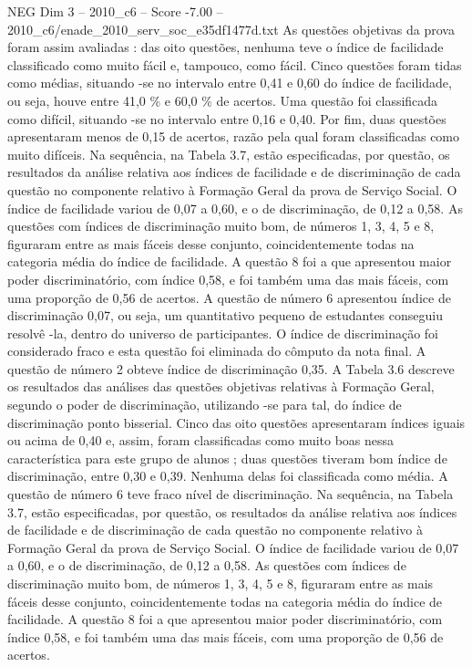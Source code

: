 \begin{textsample}{NEG Dim 3 – 2010\_c6 – Score -7.00 – 2010\_c6/enade\_2010\_serv\_soc\_e35df1477d.txt}
As questões objetivas da prova foram assim avaliadas : das oito questões, nenhuma teve o índice de facilidade classificado como muito fácil e, tampouco, como fácil.
Cinco questões foram tidas como médias, situando -se no intervalo entre 0,41 e 0,60 do índice de facilidade, ou seja, houve entre 41,0 \% e 60,0 \% de acertos.
Uma questão foi classificada como difícil, situando -se no intervalo entre 0,16 e 0,40.
Por fim, duas questões apresentaram menos de 0,15 de acertos, razão pela qual foram classificadas como muito difíceis.
Na sequência, na Tabela 3.7, estão especificadas, por questão, os resultados da análise relativa aos índices de facilidade e de discriminação de cada questão no componente relativo à Formação Geral da prova de Serviço Social.
O índice de facilidade variou de 0,07 a 0,60, e o de discriminação, de 0,12 a 0,58.
As questões com índices de discriminação muito bom, de números 1, 3, 4, 5 e 8, figuraram entre as mais fáceis desse conjunto, coincidentemente todas na categoria média do índice de facilidade.
A questão 8 foi a que apresentou maior poder discriminatório, com índice 0,58, e foi também uma das mais fáceis, com uma proporção de 0,56 de acertos.
A questão de número 6 apresentou índice de discriminação 0,07, ou seja, um quantitativo pequeno de estudantes conseguiu resolvê -la, dentro do universo de participantes.
O índice de discriminação foi considerado fraco e esta questão foi eliminada do cômputo da nota final.
A questão de número 2 obteve índice de discriminação 0,35.
A Tabela 3.6 descreve os resultados das análises das questões objetivas relativas à Formação Geral, segundo o poder de discriminação, utilizando -se para tal, do índice de discriminação ponto bisserial.
Cinco das oito questões apresentaram índices iguais ou acima de 0,40 e, assim, foram classificadas como muito boas nessa característica para este grupo de alunos ; duas questões tiveram bom índice de discriminação, entre 0,30 e 0,39.
Nenhuma delas foi classificada como média.
A questão de número 6 teve fraco nível de discriminação.
Na sequência, na Tabela 3.7, estão especificadas, por questão, os resultados da análise relativa aos índices de facilidade e de discriminação de cada questão no componente relativo à Formação Geral da prova de Serviço Social.
O índice de facilidade variou de 0,07 a 0,60, e o de discriminação, de 0,12 a 0,58.
As questões com índices de discriminação muito bom, de números 1, 3, 4, 5 e 8, figuraram entre as mais fáceis desse conjunto, coincidentemente todas na categoria média do índice de facilidade.
A questão 8 foi a que apresentou maior poder discriminatório, com índice 0,58, e foi também uma das mais fáceis, com uma proporção de 0,56 de acertos.

\end{textsample}
